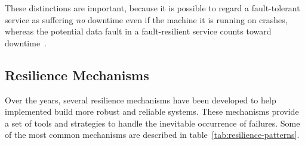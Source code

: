 These distinctions are important, because it is possible to regard a fault-tolerant service as suffering \textit{no} downtime even if the machine it is running on crashes, whereas the potential data fault in a fault-resilient service counts toward downtime~\cite{fault-tolerance-vs-fault-resilience}.

\subsection{Resilience Mechanisms}\label{subsec:resilience-mechanisms}

Over the years, several resilience mechanisms have been developed to help implemented build more robust and reliable systems.
These mechanisms provide a set of tools and strategies to handle the inevitable occurrence of failures.
Some of the most common mechanisms are described in table~\ref{tab:resilience-patterns}.

